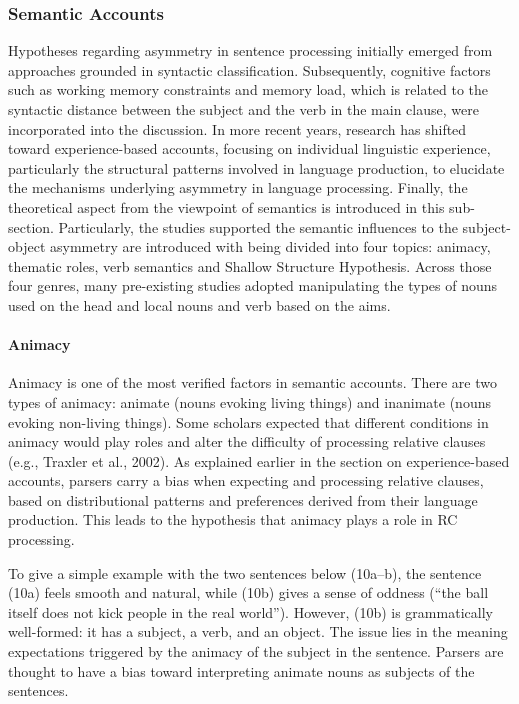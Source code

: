 \documentclass[
]{article}
\begin{document}
\subsubsection{Semantic Accounts}\label{semantic-accounts}

Hypotheses regarding asymmetry in sentence processing initially emerged
from approaches grounded in syntactic classification. Subsequently,
cognitive factors such as working memory constraints and memory load,
which is related to the syntactic distance between the subject and the
verb in the main clause, were incorporated into the discussion. In more
recent years, research has shifted toward experience-based accounts,
focusing on individual linguistic experience, particularly the
structural patterns involved in language production, to elucidate the
mechanisms underlying asymmetry in language processing. Finally, the
theoretical aspect from the viewpoint of semantics is introduced in this
sub-section. Particularly, the studies supported the semantic influences
to the subject-object asymmetry are introduced with being divided into
four topics: animacy, thematic roles, verb semantics and Shallow
Structure Hypothesis. Across those four genres, many pre-existing
studies adopted manipulating the types of nouns used on the head and
local nouns and verb based on the aims.

\paragraph{Animacy}\label{animacy}

Animacy is one of the most verified factors in semantic accounts. There
are two types of animacy: animate (nouns evoking living things) and
inanimate (nouns evoking non-living things). Some scholars expected that
different conditions in animacy would play roles and alter the
difficulty of processing relative clauses (e.g., Traxler et al., 2002).
As explained earlier in the section on experience-based accounts,
parsers carry a bias when expecting and processing relative clauses,
based on distributional patterns and preferences derived from their
language production. This leads to the hypothesis that animacy plays a
role in RC processing.

To give a simple example with the two sentences below (10a--b), the
sentence (10a) feels smooth and natural, while (10b) gives a sense of
oddness (``the ball itself does not kick people in the real world'').
However, (10b) is grammatically well-formed: it has a subject, a verb,
and an object. The issue lies in the meaning expectations triggered by
the animacy of the subject in the sentence. Parsers are thought to have
a bias toward interpreting animate nouns as subjects of the sentences.
\end{document}
